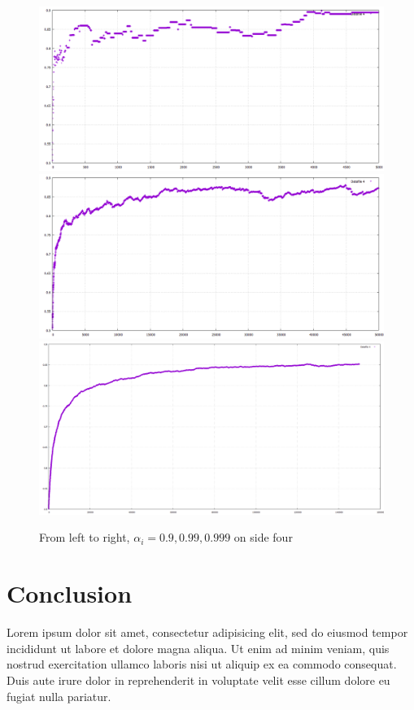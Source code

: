 \documentclass{article}
\begin{document}
\begin{figure}[htp]
\centering
\includegraphics[width=.3\textwidth]{images/ai9side4}\hfill
\includegraphics[width=.3\textwidth]{images/ai99side4}\hfill
\includegraphics[width=.3\textwidth]{images/ai999side4}
\caption{From left to right, $\alpha_i = 0.9, 0.99, 0.999$ on side four}
\label{fig:figure3}
\end{figure}

\section{Conclusion}

Lorem ipsum dolor sit amet, consectetur adipisicing elit, sed do eiusmod tempor
incididunt ut labore et dolore magna aliqua. Ut enim ad minim veniam, quis
nostrud exercitation ullamco laboris nisi ut aliquip ex ea commodo consequat.
Duis aute irure dolor in reprehenderit in voluptate velit esse cillum dolore eu
fugiat nulla pariatur.
\end{document}
